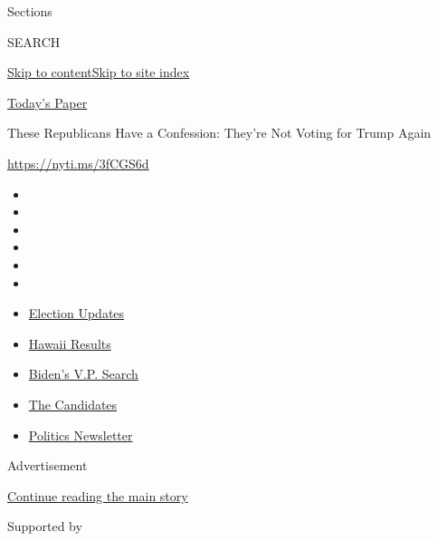 Sections

SEARCH

\protect\hyperlink{site-content}{Skip to
content}\protect\hyperlink{site-index}{Skip to site index}

\href{https://myaccount.nytimes.com/auth/login?response_type=cookie\&client_id=vi}{}

\href{https://www.nytimes.com/section/todayspaper}{Today's Paper}

These Republicans Have a Confession: They're Not Voting for Trump Again

\href{https://nyti.ms/3fCGS6d}{https://nyti.ms/3fCGS6d}

\begin{itemize}
\item
\item
\item
\item
\item
\item
\end{itemize}

\begin{itemize}
\item
  \href{https://www.nytimes.com/2020/08/07/us/elections/biden-vs-trump.html?action=click\&pgtype=Article\&state=default\&region=TOP_BANNER\&context=storylines_menu}{Election
  Updates}
\item
  \href{https://www.nytimes.com/interactive/2020/08/08/us/elections/results-hawaii-primary-elections.html?action=click\&pgtype=Article\&state=default\&region=TOP_BANNER\&context=storylines_menu}{Hawaii
  Results}
\item
  \href{https://www.nytimes.com/article/biden-vice-president-2020.html?action=click\&pgtype=Article\&state=default\&region=TOP_BANNER\&context=storylines_menu}{Biden's
  V.P. Search}
\item
  \href{https://www.nytimes.com/interactive/2019/us/politics/2020-presidential-candidates.html?action=click\&pgtype=Article\&state=default\&region=TOP_BANNER\&context=storylines_menu}{The
  Candidates}
\item
  \href{https://www.nytimes.com/newsletters/politics?action=click\&pgtype=Article\&state=default\&region=TOP_BANNER\&context=storylines_menu}{Politics
  Newsletter}
\end{itemize}

Advertisement

\protect\hyperlink{after-top}{Continue reading the main story}

Supported by

